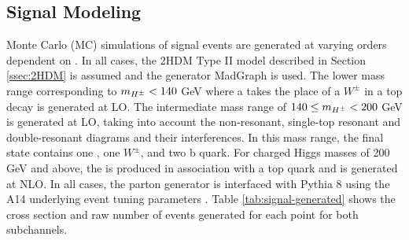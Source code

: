 		\subsection{Signal Modeling}\label{ssec:sig-modeling}
		Monte Carlo (MC) simulations of \Hpm signal events are generated at varying orders dependent on \mHpm. In all cases, the 2HDM Type II model described in Section \ref{ssec:2HDM} is assumed and the generator MadGraph is used. The lower mass range corresponding to $m_{H^{\pm}} < 140$ GeV where a \Hpm takes the place of a $W^{\pm}$ in a top decay is generated at LO. The intermediate mass range of $140 \leq m_{H^{\pm}} < 200 $ GeV is generated at LO, taking into account the non-resonant, single-top resonant and double-resonant diagrams and their interferences. In this mass range, the final state contains one \Hpm, one $W^{\pm}$, and two b quark. For charged Higgs masses of 200 GeV and above, the \Hpm is produced in association with a top quark and is generated at NLO. In all cases, the parton generator is interfaced with Pythia 8 using the A14 underlying event tuning parameters \cite{Pythia8-tunes}. Table \ref{tab:signal-generated} shows the cross section and raw number of events generated for each \mHpm point for both subchannels.

